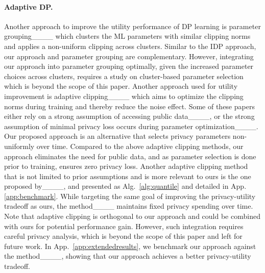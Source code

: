\paragraph{Adaptive DP.} 
Another approach to improve the utility performance of DP learning is 
parameter grouping____ which clusters the ML parameters with similar clipping norms and applies a non-uniform clipping across clusters. Similar to the IDP approach, our approach and parameter grouping are complementary. However, integrating our approach into parameter grouping optimally, given the increased parameter choices across clusters, requires a study on cluster-based parameter selection which is beyond the scope of this paper. Another approach used for utility improvement is adaptive clipping____ which aims to optimize the clipping norms during training and thereby reduce the noise effect. %
{Some of these papers either rely on a strong assumption of accessing public data____, or the strong assumption of minimal privacy loss occurs during parameter optimization____. Our proposed approach is an alternative that selects privacy parameters non-uniformly over time. Compared to the above adaptive clipping methods, our approach eliminates the need for public data, and as parameter selection is done prior to training, ensures zero privacy loss. Another adaptive clipping method that is not limited to prior assumptions and is more relevant to ours is the one proposed by____, and presented as Alg.~\ref{alg:quantile} and detailed in App.\ref{app:benchmark}. While targeting the same goal of improving the privacy-utility tradeoff as ours, the method____ maintains fixed privacy spending over time. Note that adaptive clipping is orthogonal to our approach and could be combined with ours for potential performance gain. However, such integration requires careful privacy analysis, which is beyond the scope of this paper and left for future work. In App.~\ref{app:extendedresults}, we benchmark our approach against the method____, showing that our approach achieves a better privacy-utility tradeoff.}